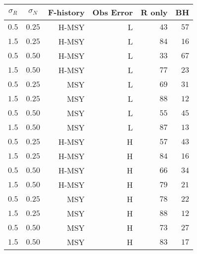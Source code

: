 \begin{center}
\begin{tabular}{rrrrrr}
\hline\hline
\multicolumn{1}{c}{$\sigma_R$}&\multicolumn{1}{c}{$\sigma_N$}&\multicolumn{1}{c}{F-history}&\multicolumn{1}{c}{Obs Error}&\multicolumn{1}{c}{R only}&\multicolumn{1}{c}{BH}\tabularnewline
\hline
$0.5$&$0.25$&H-MSY&L&$43$&$57$\tabularnewline
$1.5$&$0.25$&H-MSY&L&$84$&$16$\tabularnewline
$0.5$&$0.50$&H-MSY&L&$33$&$67$\tabularnewline
$1.5$&$0.50$&H-MSY&L&$77$&$23$\tabularnewline
$0.5$&$0.25$&MSY&L&$69$&$31$\tabularnewline
$1.5$&$0.25$&MSY&L&$88$&$12$\tabularnewline
$0.5$&$0.50$&MSY&L&$55$&$45$\tabularnewline
$1.5$&$0.50$&MSY&L&$87$&$13$\tabularnewline
$0.5$&$0.25$&H-MSY&H&$57$&$43$\tabularnewline
$1.5$&$0.25$&H-MSY&H&$84$&$16$\tabularnewline
$0.5$&$0.50$&H-MSY&H&$66$&$34$\tabularnewline
$1.5$&$0.50$&H-MSY&H&$79$&$21$\tabularnewline
$0.5$&$0.25$&MSY&H&$78$&$22$\tabularnewline
$1.5$&$0.25$&MSY&H&$88$&$12$\tabularnewline
$0.5$&$0.50$&MSY&H&$73$&$27$\tabularnewline
$1.5$&$0.50$&MSY&H&$83$&$17$\tabularnewline
\hline
\end{tabular}\end{center}
